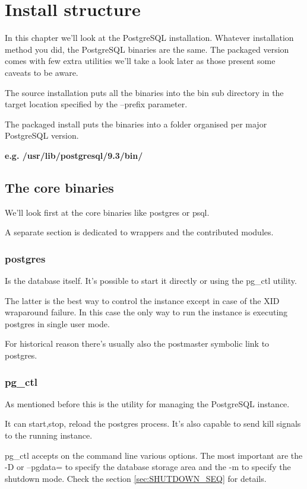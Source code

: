 \chapter{Install structure}\label{cha:INSTALLSTRUCT}
In this chapter we'll look at the PostgreSQL installation.
Whatever installation method you did, the PostgreSQL binaries are the same.
The packaged version comes with few extra utilities we'll take a look later as
those present some caveats to be aware.

The source installation puts all the binaries into the bin sub directory in the target location 
specified by the --prefix parameter.

The packaged install puts the binaries into a folder organised per major PostgreSQL version.

\textbf{e.g. /usr/lib/postgresql/9.3/bin/}

\section{The core binaries}
We'll look first at the core binaries like postgres or psql.

A separate section is dedicated to wrappers and the contributed modules.


\subsection{postgres}
Is the database itself. It's possible to start it directly or using the pg\_ctl
utility.

The latter is the best way to control the instance except in case of the XID
wraparound failure. 
In this case the only way to run the instance is executing postgres in
single user mode.

For historical reason there's usually also the postmaster symbolic link
to postgres.


\subsection{pg\_ctl}
\label{sub:PGCTL}
As mentioned before this is the utility for managing the PostgreSQL instance. 

It can start,stop, reload the postgres process.
It's also capable to send kill signals to the running instance. 

pg\_ctl accepts on the command line various options. The most important are the
-D or --pgdata= to specify the database storage area and the -m to specify the
shutdown mode. Check the section \ref{sec:SHUTDOWN_SEQ} for details. 

